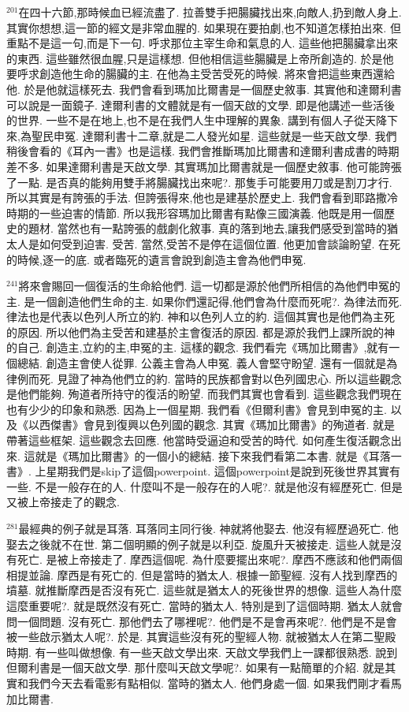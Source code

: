 \documentclass{book}
\begin{document}
$^{201}$在四十六節,那時候血已經流盡了.
拉善雙手把腸臟找出來,向敵人,扔到敵人身上.
其實你想想,這一節的經文是非常血腥的.
如果現在要拍劇,也不知道怎樣拍出來.
但重點不是這一句,而是下一句.
呼求那位主宰生命和氣息的人.
這些他把腸臟拿出來的東西.
這些雖然很血腥,只是這樣想.
但他相信這些腸臟是上帝所創造的.
於是他要呼求創造他生命的腸臟的主.
在他為主受苦受死的時候.
將來會把這些東西還給他.
於是他就這樣死去.
我們會看到瑪加比爾書是一個歷史敘事.
其實他和達爾利書可以說是一面鏡子.
達爾利書的文體就是有一個天啟的文學.
即是他講述一些活後的世界.
一些不是在地上,也不是在我們人生中理解的異象.
講到有個人子從天降下來,為聖民申冤.
達爾利書十二章,就是二人發光如星.
這些就是一些天啟文學.
我們稍後會看的《耳內一書》也是這樣.
我們會推斷瑪加比爾書和達爾利書成書的時期差不多.
如果達爾利書是天啟文學.
其實瑪加比爾書就是一個歷史敘事.
他可能誇張了一點.
是否真的能夠用雙手將腸臟找出來呢?.
那隻手可能要用刀或是割刀才行.
所以其實是有誇張的手法.
但誇張得來,他也是建基於歷史上.
我們會看到耶路撒冷時期的一些迫害的情節.
所以我形容瑪加比爾書有點像三國演義.
他既是用一個歷史的題材.
當然也有一點誇張的戲劇化敘事.
真的落到地去,讓我們感受到當時的猶太人是如何受到迫害.
受苦.
當然,受苦不是停在這個位置.
他更加會談論盼望.
在死的時候,逐一的底.
或者臨死的遺言會說到創造主會為他們申冤.

$^{241}$將來會賜回一個復活的生命給他們.
這一切都是源於他們所相信的為他們申冤的主.
是一個創造他們生命的主.
如果你們還記得,他們會為什麼而死呢?.
為律法而死.
律法也是代表以色列人所立的約.
神和以色列人立的約.
這個其實也是他們為主死的原因.
所以他們為主受苦和建基於主會復活的原因.
都是源於我們上課所說的神的自己.
創造主,立約的主,申冤的主.
這樣的觀念.
我們看完《瑪加比爾書》,就有一個總結.
創造主會使人從罪.
公義主會為人申冤.
義人會堅守盼望.
還有一個就是為律例而死.
見證了神為他們立的約.
當時的民族都會對以色列國忠心.
所以這些觀念是他們能夠.
殉道者所持守的復活的盼望.
而我們其實也會看到.
這些觀念我們現在也有少少的印象和熟悉.
因為上一個星期.
我們看《但爾利書》會見到申冤的主.
以及《以西傑書》會見到復興以色列國的觀念.
其實《瑪加比爾書》的殉道者.
就是帶著這些框架.
這些觀念去回應.
他當時受逼迫和受苦的時代.
如何產生復活觀念出來.
這就是《瑪加比爾書》的一個小的總結.
接下來我們看第二本書.
就是《耳落一書》.
上星期我們是skip了這個powerpoint.
這個powerpoint是說到死後世界其實有一些.
不是一般存在的人.
什麼叫不是一般存在的人呢?.
就是他沒有經歷死亡.
但是又被上帝接走了的觀念.

$^{281}$最經典的例子就是耳落.
耳落同主同行後.
神就將他娶去.
他沒有經歷過死亡.
他娶去之後就不在世.
第二個明顯的例子就是以利亞.
旋風升天被接走.
這些人就是沒有死亡.
是被上帝接走了.
摩西這個呢.
為什麼要擺出來呢?.
摩西不應該和他們兩個相提並論.
摩西是有死亡的.
但是當時的猶太人.
根據一節聖經.
沒有人找到摩西的墳墓.
就推斷摩西是否沒有死亡.
這些就是猶太人的死後世界的想像.
這些人為什麼這麼重要呢?.
就是既然沒有死亡.
當時的猶太人.
特別是到了這個時期.
猶太人就會問一個問題.
沒有死亡.
那他們去了哪裡呢?.
他們是不是會再來呢?.
他們是不是會被一些啟示猶太人呢?.
於是.
其實這些沒有死的聖經人物.
就被猶太人在第二聖殿時期.
有一些叫做想像.
有一些天啟文學出來.
天啟文學我們上一課都很熟悉.
說到但爾利書是一個天啟文學.
那什麼叫天啟文學呢?.
如果有一點簡單的介紹.
就是其實和我們今天去看電影有點相似.
當時的猶太人.
他們身處一個.
如果我們剛才看馬加比爾書.
\end{document}
